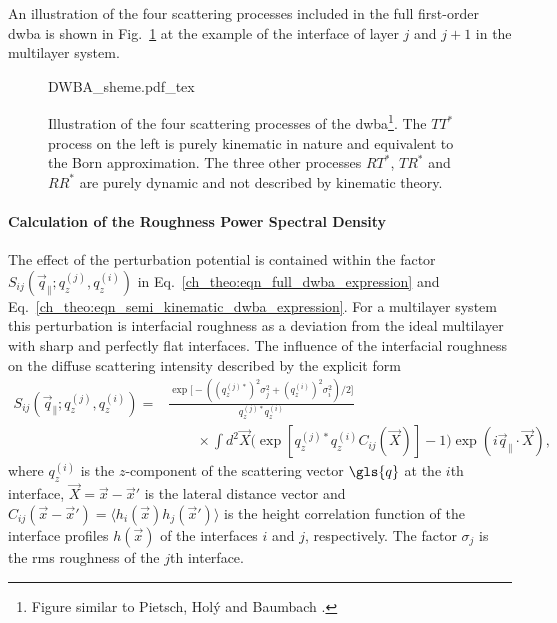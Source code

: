 An illustration of the four scattering processes included in the full first-order \gls{dwba} is shown in Fig.~\ref{ch_theo:fig_dwba_scheme} at the example of the interface of layer $j$ and $j+1$ in the multilayer system.
\begin{figure}[htb]
    \def\svgwidth{\textwidth}
    {DWBA_sheme.pdf_tex}
    \caption[Illustration of the four scattering processes of the DWBA.]{Illustration of the four scattering processes of the \gls{dwba}\footnote{Figure similar to Pietsch, Hol\'{y} and Baumbach \cite{pietsch_high-resolution_2004}.}. The $T T^*$ process on the left is purely kinematic in nature and equivalent to the Born approximation. The three other processes $RT^*$, $TR^*$ and $RR^*$ are purely dynamic and not described by kinematic theory.}
    \label{ch_theo:fig_dwba_scheme}
\end{figure}


\paragraph{Calculation of the Roughness Power Spectral Density}
The effect of the perturbation potential is contained within the factor $S_{ij}(\vec{q}_\parallel; q_z^{(j)}, q_z^{(i)})$ in Eq.~\eqref{ch_theo:eqn_full_dwba_expression} and Eq.~\eqref{ch_theo:eqn_semi_kinematic_dwba_expression}. For a multilayer system this perturbation is interfacial roughness as a deviation from the ideal multilayer with sharp and perfectly flat interfaces. The influence of the interfacial roughness on the diffuse scattering intensity described by the explicit form \cite{de_boer_x-ray_1995,de_boer_x-ray_1996}
\begin{align}
S_{ij}(\vec{q}_\parallel; q_z^{(j)}, q_z^{(i)}) = &\frac{\exp \Big[-((q_z^{(j)*})^{2} \sigma_j^2 + (q_z^{(i)})^{2} \sigma_i^2)/2\Big]}{q_z^{(j)*} q_z^{(i)}}  \nonumber \\
&\qquad \times \int d^2 \vec{X} \Big(\exp [q_z^{(j)*} q_z^{(i)} C_{ij}(\vec{X})]-1\Big) \exp(i \vec{q}_\parallel \cdot \vec{X}) \text{,} \label{ch_theo:eqn_full_dwba_roughness_factor}
\end{align}
where $q_z^{(i)}$ is the $z$-component of the scattering vector $\gls{q}$ at the $i$th interface, $\vec{X} = \vec{x} - \vec{x}'$ is the lateral distance vector and $C_{ij}(\vec{x}-\vec{x}') = \langle h_i(\vec{x}) h_j(\vec{x}') \rangle$ is the height correlation function of the interface profiles $h(\vec{x})$ of the interfaces $i$ and $j$, respectively. The factor $\sigma_j$ is the \gls{rms} roughness of the $j$th interface.


